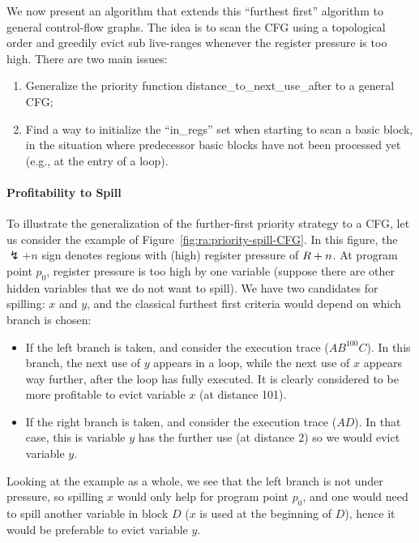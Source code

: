 {\medskip

We now present an algorithm that extends this ``furthest first'' algorithm to general control-flow graphs.
The idea is to scan the CFG using a topological order and greedily evict sub live-ranges whenever the register pressure is too high.
There are two main issues:
\begin{enumerate}
  \item Generalize the priority function distance\_to\_next\_use\_after to a general CFG;
  \item Find a way to initialize the ``in\_regs'' set when starting to scan a basic block, in the situation where predecessor basic blocks have not been processed yet (e.g., at the entry of a loop).
\end{enumerate}


\paragraph{Profitability to Spill}
To illustrate the generalization of the further-first priority strategy to a CFG, let us consider the example of Figure~\ref{fig:ra:priority-spill-CFG}.
In this figure, the $\lightning +n$ sign denotes regions with (high) register pressure of $R+n$.
At program point $p_0$, register pressure is too high by one variable (suppose there are other hidden variables that we do not want to spill).
We have two candidates for spilling: $x$ and $y$, and the classical furthest first criteria would depend on which branch is chosen:

\begin{itemize}
  \item If the left branch is taken, and consider the execution trace ($AB^{100}C$).
  In this branch, the next use of $y$ appears in a loop, while the next use of $x$ appears way further, after the loop has fully executed. 
  It is clearly considered to be more profitable to evict variable $x$ (at distance 101).


\item If the right branch is taken, and consider the execution trace ($AD$).
  In that case, this is variable $y$ has the further use (at distance 2) so we would evict variable $y$.

\end{itemize}

Looking at the example as a whole, we see that the left branch is not under pressure, so spilling $x$ would only help for program point $p_0$, and one would need to spill another variable in block $D$ ($x$ is used at the beginning of $D$), hence it would be preferable to evict variable $y$.

}
